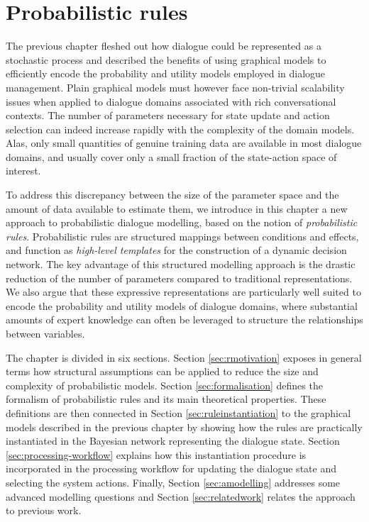 \chapter{Probabilistic rules}
\label{chap:rules}

The previous chapter fleshed out how dialogue could be represented as a stochastic process and described the benefits of using graphical models to efficiently encode the probability and utility models employed in dialogue management. Plain graphical models must however face non-trivial scalability issues when applied to dialogue domains associated with rich conversational contexts. The number of parameters necessary for state update and action selection can indeed increase rapidly with the complexity of the domain models. Alas, only small quantities of genuine training data are available in most dialogue domains, and usually cover only a small fraction of the state-action space of interest. 

To address this discrepancy between the size of the parameter space and the amount of data available to estimate them, we introduce in this chapter a new approach to probabilistic dialogue modelling, based on the notion of \textit{probabilistic rules}.  Probabilistic rules are structured mappings between conditions and effects, and function as \textit{high-level templates} for the construction of a dynamic decision network.  The key advantage of this structured modelling approach is the drastic reduction of the number of parameters compared to traditional representations.  We also argue that these expressive representations are particularly well suited to encode the probability and utility models of dialogue domains, where substantial amounts of expert knowledge can often be leveraged to structure the relationships between variables. 

The chapter is divided in six sections. Section \ref{sec:rmotivation} exposes in general terms how structural assumptions can be applied to reduce the size and complexity of probabilistic models.  Section \ref{sec:formalisation} defines the formalism of probabilistic rules and its main theoretical properties.  These definitions are then connected in Section \ref{sec:ruleinstantiation} to the graphical models described in the previous chapter by showing how the rules are practically instantiated in the Bayesian network representing the dialogue state. Section \ref{sec:processing-workflow} explains how this instantiation procedure is incorporated in the processing workflow for updating the dialogue state and selecting the system actions. Finally, Section \ref{sec:amodelling} addresses some advanced modelling questions and Section \ref{sec:relatedwork} relates the approach to previous work.


